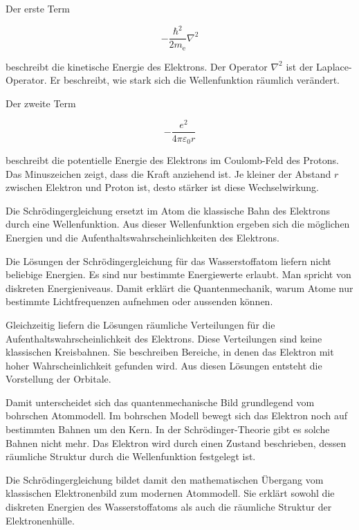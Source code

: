 Der erste Term

\begin{equation}
	-\frac{\hbar^2}{2m_\mathrm{e}}\nabla^2
	\label{eq:kinetischer_term_schroedinger}
\end{equation}

beschreibt die kinetische Energie des Elektrons. Der
Operator \(\nabla^2\) ist der Laplace-Operator. Er
beschreibt, wie stark sich die Wellenfunktion räumlich verändert.

Der zweite Term

\begin{equation}
	-\frac{e^2}{4\pi\varepsilon_0 r}
	\label{eq:coulomb_potential_wasserstoff}
\end{equation}

beschreibt die potentielle Energie des Elektrons im
Coulomb-Feld des Protons. Das Minuszeichen zeigt, dass die
Kraft anziehend ist. Je kleiner der Abstand \(r\) zwischen
Elektron und Proton ist, desto stärker ist diese Wechselwirkung.

\begin{PhysicsBox}
	\label{box:bedeutung_schroedingergleichung}
	Die Schrödingergleichung ersetzt im Atom die klassische Bahn des Elektrons
	durch eine Wellenfunktion. Aus dieser Wellenfunktion ergeben sich die
	möglichen Energien und die Aufenthaltswahrscheinlichkeiten des Elektrons.
\end{PhysicsBox}

Die Lösungen der Schrödingergleichung für das Wasserstoffatom liefern nicht
beliebige Energien. Es sind nur bestimmte Energiewerte erlaubt. Man spricht von
diskreten Energieniveaus. Damit erklärt die
Quantenmechanik, warum Atome nur bestimmte Lichtfrequenzen aufnehmen oder
aussenden können.

Gleichzeitig liefern die Lösungen räumliche Verteilungen für die
Aufenthaltswahrscheinlichkeit des Elektrons. Diese Verteilungen sind keine
klassischen Kreisbahnen. Sie beschreiben Bereiche, in denen das Elektron mit
hoher Wahrscheinlichkeit gefunden wird. Aus diesen Lösungen entsteht die
Vorstellung der Orbitale.

Damit unterscheidet sich das quantenmechanische Bild grundlegend vom bohrschen
Atommodell. Im bohrschen Modell bewegt sich das
Elektron noch auf bestimmten Bahnen um den Kern. In der Schrödinger-Theorie gibt
es solche Bahnen nicht mehr. Das Elektron wird durch einen Zustand beschrieben,
dessen räumliche Struktur durch die Wellenfunktion festgelegt ist.

Die Schrödingergleichung bildet damit den mathematischen Übergang vom
klassischen Elektronenbild zum modernen Atommodell. Sie erklärt sowohl die
diskreten Energien des Wasserstoffatoms als auch die räumliche Struktur der
Elektronenhülle.